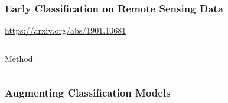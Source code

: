 \begin{frame}
\frametitle{Early Classification on Remote Sensing Data}


\url{https://arxiv.org/abs/1901.10681}

\end{frame}

%	
%	
%	


{
	\begin{frame}[plain]
	
	\vfill
	\Huge\color{white}
	\begin{center}
		\begin{columns}
			\vspace{7em}
			
			\hfill 
			Method
			
		\end{columns}
	\end{center}
	
	\vfill
\end{frame}
}

\begin{frame}
\frametitle{Augmenting Classification Models}

\begin{columns}
	
	\column{.5\textwidth}
	\begin{center}
		
		
	\end{center}
	\column{.5\textwidth}
	
	
	
\end{columns}

\end{frame}
%
%
%
%

